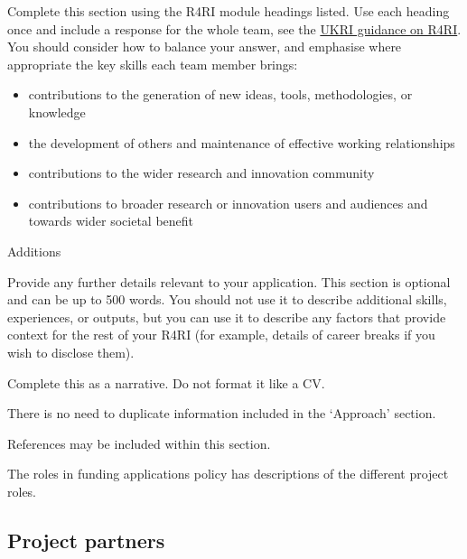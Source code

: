 \documentclass[11pt]{article}
\newenvironment{instruction}{%
    \begin{tcolorbox}[breakable,colback=red!5,colframe=red,title=Instruction]%
	}{%
    	\end{tcolorbox}%
	}
\begin{document}
\begin{instruction}
Complete this section using the R4RI module headings listed. Use each heading
once and include a response for the whole team, see the
\href{https://www.ukri.org/apply-for-funding/before-you-apply/resume-for-research-and-innovation-r4ri-guidance/}{UKRI
guidance on R4RI}. You should consider how to balance your answer, and
emphasise where appropriate the key skills each team member brings:

\begin{itemize}

	\item contributions to the generation of new ideas, tools, methodologies, or
knowledge

	\item the development of others and maintenance of effective working relationships

	\item contributions to the wider research and innovation community

	\item contributions to broader research or innovation users and audiences and
towards wider societal benefit

\end{itemize}

Additions

Provide any further details relevant to your application. This section is
optional and can be up to 500 words. You should not use it to describe
additional skills, experiences, or outputs, but you can use it to describe any
factors that provide context for the rest of your R4RI (for example, details of
career breaks if you wish to disclose them).

Complete this as a narrative. Do not format it like a CV.

There is no need to duplicate information included in the ‘Approach’ section.

References may be included within this section.

The roles in funding applications policy has descriptions of the different
project roles.

\end{instruction}



\pagebreak
\subsection{Project partners}
\end{document}
